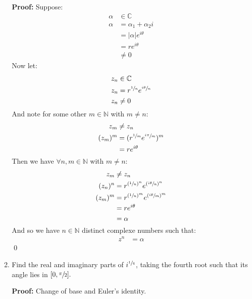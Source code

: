\begin{enumerate}
	      \textbf{Proof:}
	      Suppose:
	      \begin{align*}
		      \alpha & \in \mathbb{C}          \\
		      \alpha & = \alpha_1 + \alpha_2 i \\
		             & = |\alpha|e^{i\theta}   \\
		             & = r e^{i\theta}         \\
		             & \neq 0
	      \end{align*}
	      Now let:
	      \begin{align*}
		      z_n & \in \mathbb{C}                           \\
		      z_n & = r^{\sfrac{1}{n}}e^{\sfrac{i\theta}{n}} \\
		      z_n & \neq 0
	      \end{align*}
	      And note for some other $m \in \mathbb{N}$ with $m \neq n:$
	      \begin{align*}
		      z_m     & \neq z_n                                  \\
		      (z_m)^m & = (r^{\sfrac{1}{m}}e^{\sfrac{i\pi}{m}})^m \\
		              & = re^{i\theta}
	      \end{align*}
	      Then we have $\forall n, m \in \mathbb{N}$ with $m \neq n:$
	      \begin{align*}
		      z_m     & \neq z_n                                          \\
		      (z_n)^n & = r^{(\sfrac{1}{n})^n} e^{(\sfrac{i\theta}{n})^n} \\
		      (z_m)^m & = r^{(\sfrac{1}{n})^m} e^{(\sfrac{i\theta}{m})^m} \\
		              & = re^{i\theta}                                    \\
		              & = \alpha
	      \end{align*}
	      And so we have $n \in \mathbb{N}$ distinct complexe numbers such that:
	      \begin{align*}
		      z^n & = \alpha
	      \end{align*}
	      \qed

	\item Find the real and imaginary parts of $i^{\sfrac{1}{4}}$, taking the fourth root such that
	      its angle lies in $[0, \sfrac{\pi}{2}].$

	      \textbf{Proof:}
	      Change of base and Euler's identity.


\end{enumerate}
